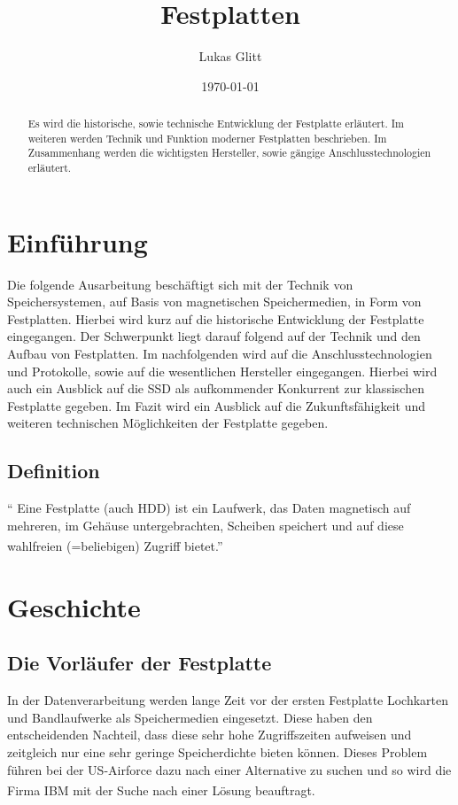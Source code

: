 \documentclass[a4paper, DIV20, 12pt, headsepline, parskip, flushleft]{scrartcl}
\begin{document}
\author{Lukas Glitt}
\title{Festplatten}
\date{\today}
\maketitle
\thispagestyle{empty}
\setcounter{page}{1}
\begin{abstract}
Es wird die historische, sowie technische Entwicklung der Festplatte erläutert. Im weiteren werden Technik und Funktion moderner Festplatten beschrieben. Im Zusammenhang werden die wichtigsten Hersteller, sowie gängige Anschlusstechnologien erläutert. 
\end{abstract}
\newpage
\tableofcontents
\thispagestyle{empty}
\setcounter{page}{1}
\newpage
\section{Einführung}
Die folgende Ausarbeitung beschäftigt sich mit der Technik von Speichersystemen, auf Basis von magnetischen Speichermedien, in Form von Festplatten. Hierbei wird kurz auf die historische Entwicklung der Festplatte eingegangen. Der Schwerpunkt liegt darauf folgend auf der Technik und den Aufbau von Festplatten. Im nachfolgenden wird auf die Anschlusstechnologien und Protokolle, sowie auf die wesentlichen Hersteller eingegangen. Hierbei wird auch ein Ausblick auf die SSD als aufkommender Konkurrent zur klassischen Festplatte gegeben. Im Fazit wird ein Ausblick auf die Zukunftsfähigkeit und weiteren technischen Möglichkeiten der Festplatte gegeben. 

\subsection{Definition}
"` Eine Festplatte (auch HDD) ist ein Laufwerk, das Daten magnetisch auf mehreren, im Gehäuse untergebrachten, Scheiben speichert und auf diese wahlfreien (=beliebigen) Zugriff bietet."' \textsuperscript{ \cite{clk}}
\section{Geschichte}
\subsection{Die Vorläufer der Festplatte}
In der Datenverarbeitung werden lange Zeit vor der ersten Festplatte Lochkarten und Bandlaufwerke als Speichermedien eingesetzt. 
Diese haben den entscheidenden Nachteil, dass diese sehr hohe Zugriffszeiten aufweisen und zeitgleich nur eine sehr geringe Speicherdichte bieten können.
Dieses Problem führen bei der US-Airforce dazu nach einer Alternative zu suchen und so wird die Firma IBM mit der Suche nach einer Lösung beauftragt. \textsuperscript{\cite{ccm}}
\end{document}
